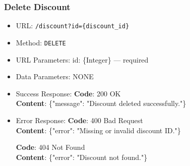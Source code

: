 \subsubsection*{Delete Discount}

\begin{itemize}
    \item URL: \texttt{/discount?id=\{discount\_id\}}
    \item Method: \texttt{DELETE}
    \item URL Parameters: id: \{Integer\} — required
    \item Data Parameters: NONE

    \item Success Response: \newline
    \textbf{Code}: 200 OK \\
    \textbf{Content}: \{"message": "Discount deleted successfully."\}

    \item Error Response: \newline
    \textbf{Code}: 400 Bad Request \\
    \textbf{Content}: \{"error": "Missing or invalid discount ID."\}

    \textbf{Code}: 404 Not Found \\
    \textbf{Content}: \{"error": "Discount not found."\}
\end{itemize}

